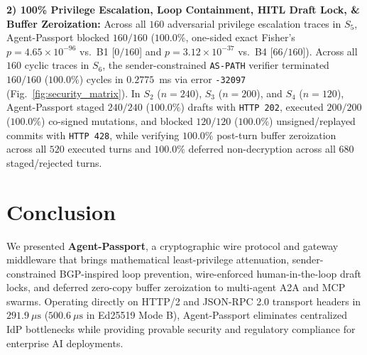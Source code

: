 \documentclass[conference,10pt]{IEEEtran}
\begin{document}
\textbf{2) 100\% Privilege Escalation, Loop Containment, HITL Draft Lock, \& Buffer Zeroization:} Across all $160$ adversarial privilege escalation traces in $S_5$, Agent-Passport blocked $160/160$ ($100.0\%$, one-sided exact Fisher's $p = 4.65 \times 10^{-96}$ vs.\ B1 [$0/160$] and $p = 3.12 \times 10^{-37}$ vs.\ B4 [$66/160$]). Across all $160$ cyclic traces in $S_6$, the sender-constrained \texttt{AS-PATH} verifier terminated $160/160$ ($100.0\%$) cycles in $0.2775$~ms via error \texttt{-32097} (Fig.~\ref{fig:security_matrix}). In $S_2$ ($n=240$), $S_3$ ($n=200$), and $S_4$ ($n=120$), Agent-Passport staged $240/240$ ($100.0\%$) drafts with \texttt{HTTP 202}, executed $200/200$ ($100.0\%$) co-signed mutations, and blocked $120/120$ ($100.0\%$) unsigned/replayed commits with \texttt{HTTP 428}, while verifying $100.0\%$ post-turn buffer zeroization across all $520$ executed turns and $100.0\%$ deferred non-decryption across all $680$ staged/rejected turns.

\section{Conclusion}
We presented \textbf{Agent-Passport}, a cryptographic wire protocol and gateway middleware that brings mathematical least-privilege attenuation, sender-constrained BGP-inspired loop prevention, wire-enforced human-in-the-loop draft locks, and deferred zero-copy buffer zeroization to multi-agent A2A and MCP swarms. Operating directly on HTTP/2 and JSON-RPC 2.0 transport headers in $291.9~\mu\text{s}$ ($500.6~\mu\text{s}$ in Ed25519 Mode B), Agent-Passport eliminates centralized IdP bottlenecks while providing provable security and regulatory compliance for enterprise AI deployments.
\end{document}
